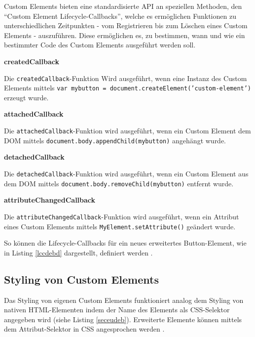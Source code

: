 Custom Elements bieten eine standardisierte \ac{API} an speziellen Methoden, den ``Custom Element Lifecycle-Callbacks'', welche es ermöglichen Funktionen zu unterschiedlichen Zeitpunkten - vom Registrieren bis zum Löschen eines Custom Elements - auszuführen. Diese ermöglichen es, zu bestimmen, wann und wie ein bestimmter Code des Custom Elements ausgeführt werden soll.

\textbf{createdCallback}

Die \texttt{createdCallback}-Funktion Wird ausgeführt, wenn eine Instanz des Custom Elements mittels \texttt{var\ mybutton\ =\ document.createElement('custom-element')} erzeugt wurde.

\textbf{attachedCallback}

Die \texttt{attachedCallback}-Funktion wird ausgeführt, wenn ein Custom Element dem \ac{DOM} mittels \texttt{document.body.appendChild(mybutton)} angehängt wurde.

\textbf{detachedCallback}

Die \texttt{detachedCallback}-Funktion wird ausgeführt, wenn ein Custom Element aus dem \ac{DOM} mittels \texttt{document.body.removeChild(mybutton)} entfernt wurde.

\textbf{attributeChangedCallback}

Die \texttt{attributeChangedCallback}-Funktion wird ausgeführt, wenn ein Attribut eines Custom Elements mittels \texttt{MyElement.setAttribute()} geändert wurde.

So können die Lifecycle-Callbacks für ein neues erweitertes Button-Element, wie in Listing \ref{lccdebd} dargestellt, definiert werden \cite{citeulike:13844988}.




\subsection{Styling von Custom Elements}\label{styling-von-custom-elements}

Das Styling von eigenen Custom Elements funktioniert analog dem Styling von nativen \ac{HTML}-Elementen indem der Name des Elements als \ac{CSS}-Selektor angegeben wird (siehe Listing \ref{seceudeb}). Erweiterte Elemente können mittels dem Attribut-Selektor in \ac{CSS} angesprochen werden \cite[S. 127-138]{citeulike:13844975}.




